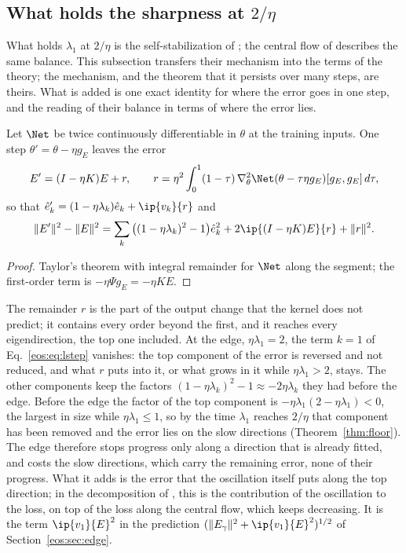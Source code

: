 \subsection{What holds the sharpness at \texorpdfstring{$2/\eta$}{2/eta}}\label{eos:sec:cap}

What holds $\lambda_1$ at $2/\eta$ is the self-stabilization of \cite{damian2023}; the central flow of \cite{cohen2025} describes the same balance.
This subsection transfers their mechanism into the terms of the theory; the mechanism, and the theorem that it persists over many steps, are theirs.
What is added is one exact identity for where the error goes in one step, and the reading of their balance in terms of where the error lies.

\begin{proposition}\label{eos:prop:estep}
Let $\Net$ be twice continuously differentiable in $\theta$ at the training inputs. One step $\theta' = \theta - \eta g_E$ leaves the error
\begin{equation}\label{eos:eq:estep}
E' = (I - \eta K)E + r,\qquad r = \eta^2\int_0^1(1 - \tau)\,\nabla^2_\theta\Net(\theta - \tau\eta g_E)[g_E, g_E]\,d\tau ,
\end{equation}
so that $\hat e_k' = (1 - \eta\lambda_k)\hat e_k + \ip{v_k}{r}$ and
\begin{equation}\label{eos:eq:lstep}
\|E'\|^2 - \|E\|^2 = \sum_k\big((1 - \eta\lambda_k)^2 - 1\big)\hat e_k^2 + 2\ip{(I - \eta K)E}{r} + \|r\|^2 .
\end{equation}
\end{proposition}

\begin{proof}
Taylor's theorem with integral remainder for $\Net$ along the segment; the first-order term is $-\eta\Psi g_E = -\eta KE$.
\end{proof}

The remainder $r$ is the part of the output change that the kernel does not predict; it contains every order beyond the first, and it reaches every eigendirection, the top one included.
At the edge, $\eta\lambda_1 = 2$, the term $k = 1$ of Eq.~\eqref{eos:eq:lstep} vanishes: the top component of the error is reversed and not reduced, and what $r$ puts into it, or what grows in it while $\eta\lambda_1 > 2$, stays.
The other components keep the factors $(1 - \eta\lambda_k)^2 - 1\approx-2\eta\lambda_k$ they had before the edge.
Before the edge the factor of the top component is $-\eta\lambda_1(2 - \eta\lambda_1) < 0$, the largest in size while $\eta\lambda_1\le1$, so by the time $\lambda_1$ reaches $2/\eta$ that component has been removed and the error lies on the slow directions (Theorem~\ref{thm:floor}).
The edge therefore stops progress only along a direction that is already fitted, and costs the slow directions, which carry the remaining error, none of their progress.
What it adds is the error that the oscillation itself puts along the top direction; in the decomposition of \cite{cohen2025}, this is the contribution of the oscillation to the loss, on top of the loss along the central flow, which keeps decreasing.
It is the term $\ip{v_1}{E}^2$ in the prediction $(\|E_\gamma\|^2 + \ip{v_1}{E}^2)^{1/2}$ of Section~\ref{eos:sec:edge}.

